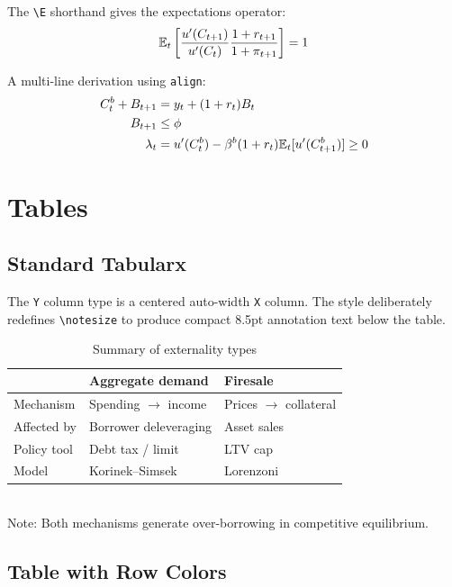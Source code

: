 \documentclass[11pt,a4paper]{article}
\begin{document}
The \verb|\E| shorthand gives the expectations operator:
\[
    \mathbb{E}_t\left[\frac{u'(C_{t+1})}{u'(C_t)}\frac{1+r_{t+1}}{1+\pi_{t+1}}\right] = 1
\]

A multi-line derivation using \texttt{align}:
\begin{align}
    C_t^b + B_{t+1} &= y_t + (1+r_t)B_t \\
    B_{t+1}         &\leq \phi \label{eq:constraint}\\
    \lambda_t       &= u'(C_t^b) - \beta^b(1+r_t)\mathbb{E}_t[u'(C_{t+1}^b)] \geq 0
\end{align}

\section{Tables}

\subsection{Standard Tabularx}

The \texttt{Y} column type is a centered auto-width \texttt{X} column. The style deliberately redefines \verb|\notesize| to produce compact 8.5pt annotation text below the table.

\begin{table}[h!]
\centering
\caption{Summary of externality types}
\begin{tabularx}{0.85\linewidth}{lYY}
    \toprule
    & \textbf{Aggregate demand} & \textbf{Firesale} \\
    \midrule
    Mechanism   & Spending $\to$ income & Prices $\to$ collateral \\
    Affected by & Borrower deleveraging & Asset sales \\
    Policy tool & Debt tax / limit & LTV cap \\
    Model       & Korinek--Simsek & Lorenzoni \\
    \bottomrule
\end{tabularx}
\\[0.4em]
{\notesize Note: Both mechanisms generate over-borrowing in competitive equilibrium.}
\end{table}

\subsection{Table with Row Colors}
\end{document}
